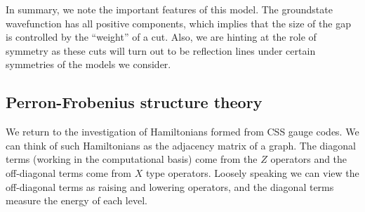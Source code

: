 \documentclass[12pt]{article}
\begin{document}
In summary, we note the important
features of this model.
The groundstate wavefunction has all
positive components, which implies
that the size of the gap is controlled
by the ``weight'' of a cut.
Also, we are hinting at the role
of symmetry as these cuts will
turn out to be reflection lines
under certain symmetries of the models
we consider.

\subsection{Perron-Frobenius structure theory}



We return to the investigation of Hamiltonians
formed from CSS gauge codes.
We can think of such Hamiltonians as the adjacency matrix of a graph.
The diagonal terms (working in the computational basis)
come from the $Z$ operators and the off-diagonal terms
come from $X$ type operators.
Loosely speaking we can view the off-diagonal terms as 
raising and lowering operators, and the diagonal
terms measure the energy of each level.
\end{document}
